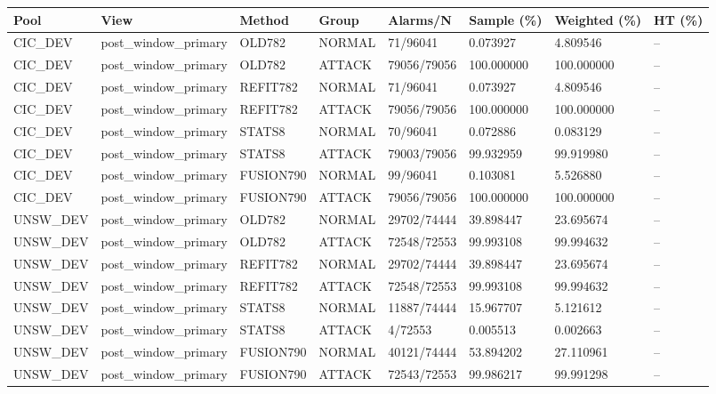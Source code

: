 \begin{tabular}{llllllll}
\hline
Pool & View & Method & Group & Alarms/N & Sample (\%) & Weighted (\%) & HT (\%) \\
\hline
CIC\_DEV & post\_window\_primary & OLD782 & NORMAL & 71/96041 & 0.073927 & 4.809546 & -- \\
CIC\_DEV & post\_window\_primary & OLD782 & ATTACK & 79056/79056 & 100.000000 & 100.000000 & -- \\
CIC\_DEV & post\_window\_primary & REFIT782 & NORMAL & 71/96041 & 0.073927 & 4.809546 & -- \\
CIC\_DEV & post\_window\_primary & REFIT782 & ATTACK & 79056/79056 & 100.000000 & 100.000000 & -- \\
CIC\_DEV & post\_window\_primary & STATS8 & NORMAL & 70/96041 & 0.072886 & 0.083129 & -- \\
CIC\_DEV & post\_window\_primary & STATS8 & ATTACK & 79003/79056 & 99.932959 & 99.919980 & -- \\
CIC\_DEV & post\_window\_primary & FUSION790 & NORMAL & 99/96041 & 0.103081 & 5.526880 & -- \\
CIC\_DEV & post\_window\_primary & FUSION790 & ATTACK & 79056/79056 & 100.000000 & 100.000000 & -- \\
UNSW\_DEV & post\_window\_primary & OLD782 & NORMAL & 29702/74444 & 39.898447 & 23.695674 & -- \\
UNSW\_DEV & post\_window\_primary & OLD782 & ATTACK & 72548/72553 & 99.993108 & 99.994632 & -- \\
UNSW\_DEV & post\_window\_primary & REFIT782 & NORMAL & 29702/74444 & 39.898447 & 23.695674 & -- \\
UNSW\_DEV & post\_window\_primary & REFIT782 & ATTACK & 72548/72553 & 99.993108 & 99.994632 & -- \\
UNSW\_DEV & post\_window\_primary & STATS8 & NORMAL & 11887/74444 & 15.967707 & 5.121612 & -- \\
UNSW\_DEV & post\_window\_primary & STATS8 & ATTACK & 4/72553 & 0.005513 & 0.002663 & -- \\
UNSW\_DEV & post\_window\_primary & FUSION790 & NORMAL & 40121/74444 & 53.894202 & 27.110961 & -- \\
UNSW\_DEV & post\_window\_primary & FUSION790 & ATTACK & 72543/72553 & 99.986217 & 99.991298 & -- \\

\end{tabular}
